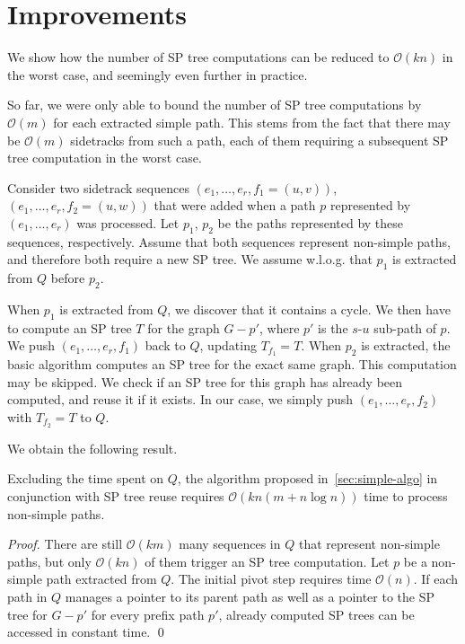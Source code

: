 \documentclass[runningheads,a4paper]{llncs}
\begin{document}
\section{Improvements}
\label{sec:improve}

We show how the number of SP tree computations can be reduced to $\mathcal O(kn)$ in the worst case, and seemingly even further in practice.

So far, we were only able to bound the number of SP tree computations by $\mathcal O(m)$ for each extracted simple path.
This stems from the fact that there may be $\mathcal O(m)$ sidetracks from such a path, each of them requiring a subsequent SP tree computation in the worst case.

Consider two sidetrack sequences $(e_1, \ldots, e_r, f_1 = (u, v))$, $(e_1, \ldots, e_r, f_2 = (u, w))$ that were added when a path $p$ represented by $(e_1, \ldots, e_r)$ was processed.
Let $p_1$, $p_2$ be the paths represented by these sequences, respectively.
Assume that both sequences represent non-simple paths, and therefore both require a new SP tree.
We assume w.l.o.g. that $p_1$ is extracted from $Q$ before $p_2$.

When $p_1$ is extracted from $Q$, we discover that it contains a cycle.
We then have to compute an SP tree $T$ for the graph $G - p'$, where $p'$ is the $s$-$u$ sub-path of $p$.
We push $(e_1, \ldots, e_r, f_1)$ back to $Q$, updating $T_{f_1} = T$.
When $p_2$ is extracted, the basic algorithm computes an SP tree for the exact same graph.
This computation may be skipped.
We check if an SP tree for this graph has already been computed, and reuse it if it exists.
In our case, we simply push $(e_1, \ldots, e_r, f_2)$ with $T_{f_2} = T$ to $Q$.

We obtain the following result.

\begin{lemma}
    Excluding the time spent on $Q$, the algorithm proposed in~\autoref{sec:simple-algo} in conjunction with SP tree reuse requires $\mathcal O(kn(m + n \log n))$ time to process non-simple paths.
\end{lemma}
\begin{proof}
    There are still $\mathcal O(km)$ many sequences in $Q$ that represent non-simple paths, but only $\mathcal O(kn)$ of them trigger an SP tree computation.
    Let $p$ be a non-simple path extracted from $Q$.
    The initial pivot step requires time $\mathcal O(n)$.
    If each path in $Q$ manages a pointer to its parent path as well as a pointer to the SP tree for $G - p'$ for every prefix path $p'$, already computed SP trees can be accessed in constant time.
    \qed
\end{proof}
\end{document}
